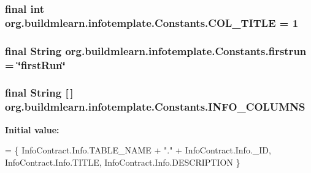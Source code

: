 \subsubsection[{\texorpdfstring{C\+O\+L\+\_\+\+T\+I\+T\+LE}{COL_TITLE}}]{\setlength{\rightskip}{0pt plus 5cm}final int org.\+buildmlearn.\+infotemplate.\+Constants.\+C\+O\+L\+\_\+\+T\+I\+T\+LE = 1\hspace{0.3cm}{\ttfamily [static]}}\hypertarget{classorg_1_1buildmlearn_1_1infotemplate_1_1Constants_ae2a4192623b0846f515eb1e74e7ce486}{}\label{classorg_1_1buildmlearn_1_1infotemplate_1_1Constants_ae2a4192623b0846f515eb1e74e7ce486}
\subsubsection[{\texorpdfstring{firstrun}{firstrun}}]{\setlength{\rightskip}{0pt plus 5cm}final String org.\+buildmlearn.\+infotemplate.\+Constants.\+firstrun = \char`\"{}first\+Run\char`\"{}\hspace{0.3cm}{\ttfamily [static]}}\hypertarget{classorg_1_1buildmlearn_1_1infotemplate_1_1Constants_a4d1fbe622b1f25a73bbb51eac2ff46a4}{}\label{classorg_1_1buildmlearn_1_1infotemplate_1_1Constants_a4d1fbe622b1f25a73bbb51eac2ff46a4}
\subsubsection[{\texorpdfstring{I\+N\+F\+O\+\_\+\+C\+O\+L\+U\+M\+NS}{INFO_COLUMNS}}]{\setlength{\rightskip}{0pt plus 5cm}final String \mbox{[}$\,$\mbox{]} org.\+buildmlearn.\+infotemplate.\+Constants.\+I\+N\+F\+O\+\_\+\+C\+O\+L\+U\+M\+NS\hspace{0.3cm}{\ttfamily [static]}}\hypertarget{classorg_1_1buildmlearn_1_1infotemplate_1_1Constants_ab3f048dc159aa767ce63e2f4732ce323}{}\label{classorg_1_1buildmlearn_1_1infotemplate_1_1Constants_ab3f048dc159aa767ce63e2f4732ce323}
{\bfseries Initial value\+:}
\begin{DoxyCode}
= \{
            InfoContract.Info.TABLE\_NAME + \textcolor{stringliteral}{"."} + InfoContract.Info.\_ID,
            InfoContract.Info.TITLE,
            InfoContract.Info.DESCRIPTION
    \}
\end{DoxyCode}
